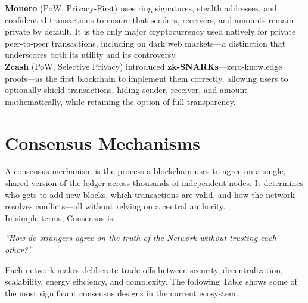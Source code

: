 \documentclass[12pt, a4paper, oneside]{report}
\theoremstyle{definition}
\begin{document}
\textbf{Monero} (PoW, Privacy-First) uses ring signatures, stealth addresses, and 
confidential transactions to ensure that senders, receivers, and amounts remain 
private by default. It is the only major cryptocurrency used natively for private 
peer-to-peer transactions, including on dark web markets—a distinction that 
underscores both its utility and its controversy.\\[0.4cm]

\textbf{Zcash} (PoW, Selective Privacy) introduced \textbf{zk-SNARKs}—zero-knowledge 
proofs—as the first blockchain to implement them correctly, allowing users to 
optionally shield transactions, hiding sender, receiver, and amount 
mathematically, while retaining the option of full transparency.











\section{Consensus Mechanisms}
\label{chap:consensus}



A consensus mechanism is the process a blockchain uses to agree on a single, shared 
version of the ledger across thousands of independent nodes. It determines who gets 
to add new blocks, which transactions are valid, and how the network resolves 
conflicts—all without relying on a central authority.\\[0.4cm]

In simple terms, Consensus is:
\begin{center}
\textit{``How do strangers agree on the truth of the Network without trusting each other?''}\\[1cm]

\end{center}



Each network makes deliberate trade-offs between security, decentralization, 
scalability, energy efficiency, and complexity. The following Table shows some of the 
most significant consensus designs in the current ecosystem.\\[0.6cm]
\end{document}
